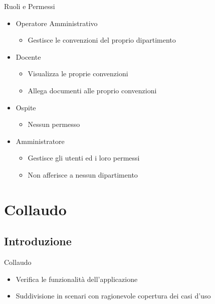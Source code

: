 \begin{frame}{Ruoli e Permessi}
\begin{itemize}
	
\item Operatore Amministrativo
	\begin{itemize}
	\item Gestisce le convenzioni del proprio dipartimento
	\end{itemize}

\vspace{0.8em}
\item Docente
	\begin{itemize}
	\item Visualizza le proprie convenzioni
	\item Allega documenti alle proprio convenzioni
	\end{itemize}

\vspace{0.8em}
\item Ospite
	\begin{itemize}
	\item Nessun permesso
	\end{itemize}

\vspace{0.8em}
\item Amministratore
	\begin{itemize}
	\item Gestisce gli utenti ed i loro permessi
	\item Non afferisce a nessun dipartimento
	\end{itemize}
\end{itemize}
\end{frame}

\section{Collaudo}
\subsection{Introduzione}
\begin{frame}{Collaudo}
\begin{itemize}
\item Verifica le funzionalità dell'applicazione
\vspace{0.8em}
\item Suddivisione in scenari con ragionevole copertura\newline
dei casi d'uso
\end{itemize}

\end{frame}

